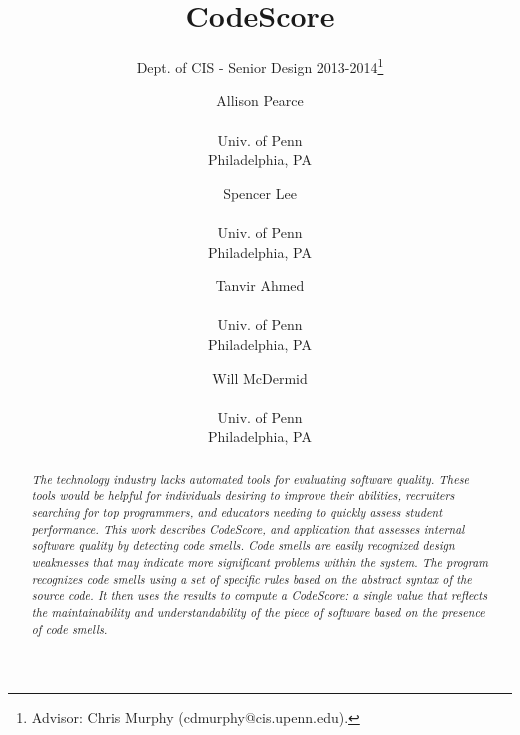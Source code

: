 \documentclass{sig-alternate}
\begin{document}

\title{CodeScore}
\subtitle{Dept. of CIS - Senior Design 2013-2014\thanks{Advisor: Chris Murphy (cdmurphy@cis.upenn.edu).}}

\author{
	Allison Pearce \\  \\ Univ. of Penn \\ Philadelphia, PA
	\and Spencer Lee \\  \\ Univ. of Penn \\ Philadelphia, PA
	\and Tanvir Ahmed \\  \\ Univ. of Penn \\ Philadelphia, PA
\and Will McDermid \\  \\ Univ. of Penn \\ Philadelphia, PA}

\date{}
\maketitle

\begin{abstract}
	\textit{The technology industry lacks automated tools for evaluating software
		quality. These tools would be helpful for individuals desiring to improve
		their abilities, recruiters searching for top programmers, and educators
		needing to quickly assess student performance. This work describes
		CodeScore, and application that assesses internal software
	quality by detecting code smells. Code smells are easily recognized design
weaknesses that may indicate more significant problems within the system. The
program recognizes code smells using a set of specific rules based on the
abstract syntax of the source code. It then
uses the results to compute a CodeScore: a single value that reflects the
maintainability and understandability of the piece of software based on the
presence of code smells. }
\end{abstract}

\end{document}
